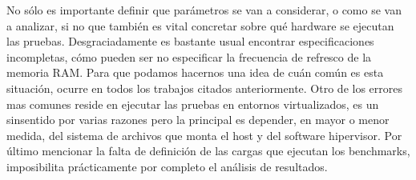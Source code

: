 No sólo es importante definir que parámetros se van a considerar, o como se van a analizar, si no que también es vital concretar sobre qué hardware se ejecutan las pruebas. Desgraciadamente es bastante usual encontrar especificaciones incompletas, cómo pueden ser no especificar la frecuencia de refresco de la memoria RAM. Para que podamos hacernos una idea de cuán común es esta situación, ocurre en todos los trabajos citados anteriormente. Otro de los errores mas comunes reside en ejecutar las pruebas en entornos virtualizados, es un sinsentido por varias razones pero la principal es depender, en mayor o menor medida, del sistema de archivos que monta el host y del software hipervisor. Por último mencionar la falta de definición de las cargas que ejecutan los benchmarks, imposibilita prácticamente por completo el análisis de resultados.


